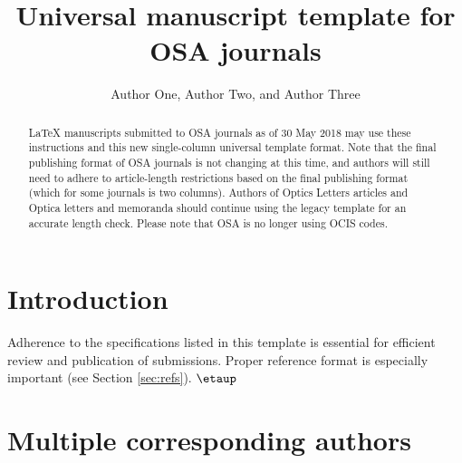 \documentclass{osa-article}
\begin{document}
\title{Universal manuscript template for OSA journals}

\author{Author One, Author Two, and Author Three}

\address{Peer Review, Publications Department, The Optical Society (OSA), 2010 Massachusetts Avenue NW, Washington, DC 20036, USA\\
Publications Department, The Optical Society (OSA), 2010 Massachusetts Avenue NW, Washington, DC 20036, USA\\
Currently with the Department of Electronic Journals, The Optical Society (OSA), 2010 Massachusetts Avenue NW, Washington, DC 20036, USA}




\begin{abstract}
\LaTeX{} manuscripts submitted to OSA journals as of 30 May 2018 may use these instructions and this new single-column universal template format. Note that the final publishing format of OSA journals is not changing at this time, and authors will still need to adhere to article-length restrictions based on the final publishing format (which for some journals is two columns). Authors of Optics Letters articles and Optica letters and memoranda should continue using the legacy template for an accurate length check. Please note that OSA is no longer using OCIS codes.
\end{abstract}

\section{Introduction}
Adherence to the specifications listed in this template is essential for efficient review and publication of submissions. Proper reference format is especially important (see Section \ref{sec:refs}). $\etaup$

\section{Multiple corresponding authors}
\end{document}
